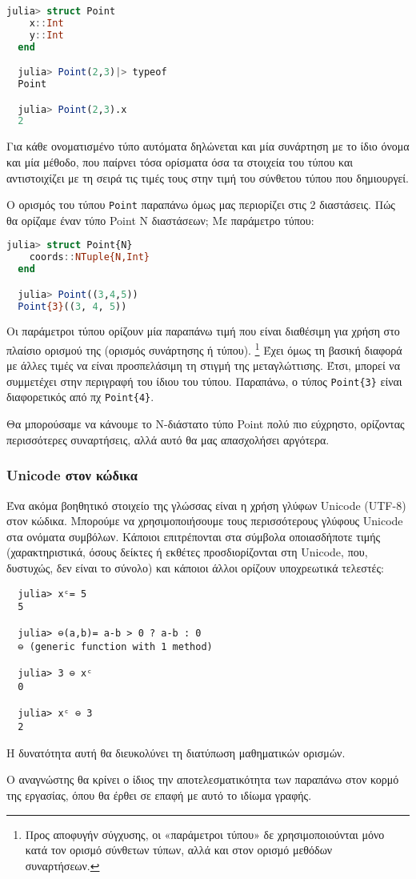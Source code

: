   \begin{lstlisting}[language=julia]
  julia> struct Point
    x::Int
    y::Int
  end

  julia> Point(2,3)|> typeof
  Point

  julia> Point(2,3).x
  2
  \end{lstlisting}

  Για κάθε ονοματισμένο τύπο αυτόματα δηλώνεται και μία συνάρτηση με το ίδιο όνομα και μία μέθοδο,
  που παίρνει τόσα ορίσματα όσα τα στοιχεία του τύπου και αντιστοιχίζει με τη σειρά τις τιμές τους στην τιμή του σύνθετου τύπου που δημιουργεί.

  Ο ορισμός του τύπου \verb|Point| παραπάνω όμως μας περιορίζει στις 2 διαστάσεις.
  Πώς θα ορίζαμε έναν τύπο Point Ν διαστάσεων; Με παράμετρο τύπου:

  \begin{lstlisting}[language=julia]
  julia> struct Point{N}
    coords::NTuple{N,Int}
  end

  julia> Point((3,4,5))
  Point{3}((3, 4, 5))
  \end{lstlisting}

  Οι παράμετροι τύπου ορίζουν μία παραπάνω τιμή που είναι διαθέσιμη για χρήση στο πλαίσιο ορισμού της (ορισμός συνάρτησης ή τύπου).
  \footnote{Προς αποφυγήν σύγχυσης, οι «παράμετροι τύπου» δε χρησιμοποιούνται μόνο
  κατά τον ορισμό σύνθετων τύπων, αλλά και στον ορισμό μεθόδων συναρτήσεων.}
  Έχει όμως τη βασική διαφορά με άλλες τιμές να είναι προσπελάσιμη τη στιγμή της μεταγλώττισης.
  Έτσι, μπορεί να συμμετέχει στην περιγραφή του ίδιου του τύπου.
  Παραπάνω, ο τύπος \verb|Point{3}| είναι διαφορετικός από πχ \verb|Point{4}|.

  Θα μπορούσαμε να κάνουμε το Ν-διάστατο τύπο Point πολύ πιο εύχρηστο, ορίζοντας περισσότερες συναρτήσεις,
  αλλά αυτό θα μας απασχολήσει αργότερα.

  \subsubsection{Unicode στον κώδικα}

  Ένα ακόμα βοηθητικό στοιχείο της γλώσσας είναι η χρήση γλύφων Unicode (UTF-8) στον κώδικα.
  Μπορούμε να χρησιμοποιήσουμε τους περισσότερους γλύφους Unicode στα ονόματα συμβόλων.
  Κάποιοι επιτρέπονται στα σύμβολα οποιασδήποτε τιμής (χαρακτηριστικά, όσους δείκτες ή εκθέτες προσδιορίζονται στη Unicode, που, δυστυχώς, δεν είναι το σύνολο)
  και κάποιοι άλλοι ορίζουν υποχρεωτικά τελεστές:

  \begin{lstlisting}
  julia> xᶜ= 5
  5

  julia> ⊖(a,b)= a-b > 0 ? a-b : 0
  ⊖ (generic function with 1 method)

  julia> 3 ⊖ xᶜ
  0

  julia> xᶜ ⊖ 3
  2
  \end{lstlisting}

  Η δυνατότητα αυτή θα διευκολύνει τη διατύπωση μαθηματικών ορισμών.

  Ο αναγνώστης θα κρίνει ο ίδιος την αποτελεσματικότητα των παραπάνω στον κορμό της εργασίας, όπου θα έρθει σε επαφή με αυτό το ιδίωμα γραφής.
